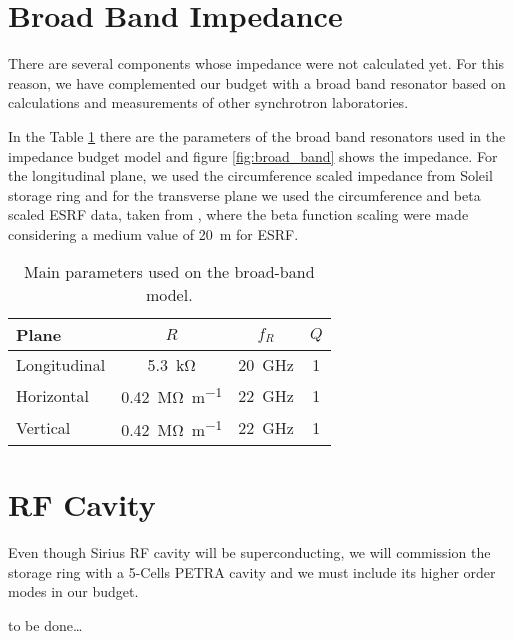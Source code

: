 

\section{Broad Band Impedance}

There are several components whose impedance were not calculated yet. For this reason, we have complemented our budget with a broad band resonator based on calculations and measurements of other synchrotron laboratories.

In the Table \ref{tab:broad_band_data} there are the parameters of the broad band resonators used in the impedance budget model and figure \ref{fig:broad_band} shows the impedance. For the longitudinal plane, we used the circumference scaled impedance from Soleil storage ring \cite{nagaoka2006} and for the transverse plane we used the circumference and beta scaled ESRF data, taken from \cite{nagaoka1999}, where the beta function scaling were made considering a medium value of \SI{20}{\meter} for ESRF.

\begin{table}[!hb]
 \centering
 \caption{Main parameters used on the broad-band model.}
 \label{tab:broad_band_data}
 \begin{tabular}{lccc}\hline
  Plane &  $R$ &  $f_R$  & $Q$\\\hline
  Longitudinal & \SI{5.3}{\kilo\ohm}& \SI{20}{\giga\hertz} &1\\\hline
  Horizontal & \SI{0.42}{\mega\ohm\per\meter} &\SI{22}{\giga\hertz} & 1 \\\hline
  Vertical   & \SI{0.42}{\mega\ohm\per\meter} &\SI{22}{\giga\hertz} & 1 \\\hline
 \end{tabular}
\end{table}



\section{RF Cavity}

Even though Sirius RF cavity will be superconducting, we will commission the storage ring with a 5-Cells PETRA cavity and we must include its higher order modes in our budget.

to be done\dots

